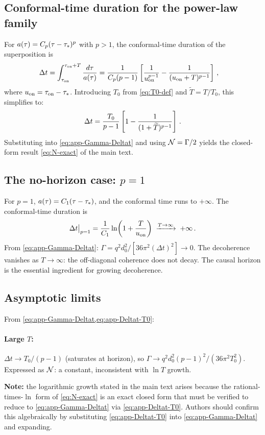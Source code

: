 \subsection*{Conformal-time duration for the power-law family}

For $a(\tau) = C_{p}(\tau-\tau_{*})^{p}$ with $p > 1$, the conformal-time
duration of the superposition is
%
\begin{align}
  \Delta t
  &=
  \int_{\tau_{\rm on}}^{\tau_{\rm on}+T}\frac{d\tau}{a(\tau)}
  =
  \frac{1}{C_{p}(p-1)}
  \left[\frac{1}{u_{\rm on}^{p-1}} - \frac{1}{(u_{\rm on}+T)^{p-1}}\right] \,,
  \label{eq:app-Deltat}
\end{align}
%
where $u_{\rm on} = \tau_{\rm on}-\tau_{*}$.  Introducing $T_{0}$ from \cref{eq:T0-def}
and $\widetilde{T} = T/T_{0}$, this simplifies to:
%
\begin{equation}
  \Delta t
  =
  \frac{T_{0}}{p-1}
  \left[1 - \frac{1}{(1+\widetilde{T})^{p-1}}\right] \,.
  \label{eq:app-Deltat-T0}
\end{equation}
%
Substituting into \cref{eq:app-Gamma-Deltat} and using $\mathcal{N} = \Gamma/2$ yields the
closed-form result \cref{eq:N-exact} of the main text.

\subsection*{The no-horizon case: $p = 1$}

For $p = 1$, $a(\tau) = C_{1}(\tau-\tau_{*})$, and the conformal time runs to
$+\infty$.  The conformal-time duration is
%
\begin{equation}
  \Delta t\big|_{p=1}
  = \frac{1}{C_{1}}\ln\!\left(1 + \frac{T}{u_{\rm on}}\right)
  \;\xrightarrow{T\to\infty}\;
  +\infty \,.
\end{equation}
%
From \cref{eq:app-Gamma-Deltat}: $\Gamma = q^{2}d_{0}^{2}/[36\pi^{2}(\Delta t)^{2}]\to 0$.
The decoherence vanishes as $T\to\infty$: the off-diagonal coherence does not decay.
The causal horizon is the essential ingredient for growing decoherence.

\subsection*{Asymptotic limits}

From \cref{eq:app-Gamma-Deltat,eq:app-Deltat-T0}:

\paragraph{Large $T$:} $\Delta t \to T_{0}/(p-1)$ (saturates at horizon),
so $\Gamma \to q^{2}d_{0}^{2}(p-1)^{2}/(36\pi^{2}T_{0}^{2})$.
Expressed as $\mathcal{N}$: a constant, inconsistent with $\ln T$ growth.

\noindent
\textbf{Note:} the logarithmic growth stated in the main text arises because the
rational-times-$\ln$ form of \cref{eq:N-exact} is an exact closed form that must
be verified to reduce to \cref{eq:app-Gamma-Deltat} via \cref{eq:app-Deltat-T0}.
Authors should confirm this algebraically by substituting \cref{eq:app-Deltat-T0}
into \cref{eq:app-Gamma-Deltat} and expanding.
